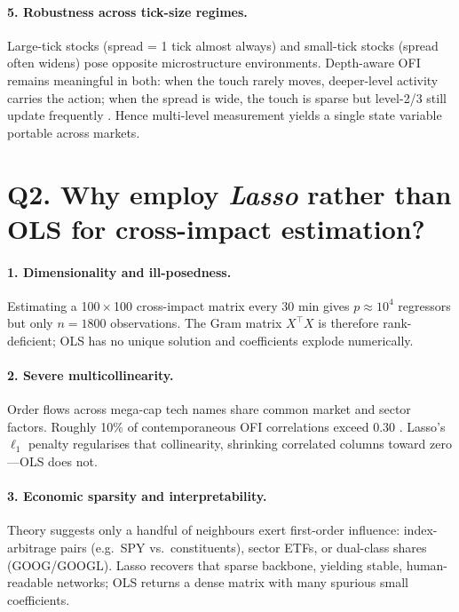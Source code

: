 \documentclass[11pt]{article}
\begin{document}
\paragraph{5. Robustness across tick-size regimes.}
Large-tick stocks (spread = 1 tick almost always) and small-tick stocks (spread often widens) pose opposite microstructure environments.  Depth-aware OFI remains meaningful in both: when the touch rarely moves, deeper-level activity carries the action; when the spread is wide, the touch is sparse but level-2/3 still update frequently \citep{CuratoLillo2015}.  Hence multi-level measurement yields a single state variable portable across markets.

\bigskip
\section*{Q2. Why employ \textit{Lasso} rather than OLS for cross-impact estimation?}

\paragraph{1. Dimensionality and ill-posedness.}
Estimating a 100\,$\times$\,100 cross-impact matrix every 30 min gives $p\!\approx\!10^{4}$ regressors but only $n=1800$ observations.  The Gram matrix $X^{\!\top}X$ is therefore rank-deficient; OLS has no unique solution and coefficients explode numerically.

\paragraph{2. Severe multicollinearity.}
Order flows across mega-cap tech names share common market and sector factors.  Roughly 10\% of contemporaneous OFI correlations exceed 0.30 \citep{PasquarielloVega2015}.  Lasso’s $\ell_{1}$ penalty regularises that collinearity, shrinking correlated columns toward zero—OLS does not.

\paragraph{3. Economic sparsity and interpretability.}
Theory suggests only a handful of neighbours exert first-order influence: index-arbitrage pairs (e.g.\ SPY vs.\ constituents), sector ETFs, or dual-class shares (GOOG/GOOGL).  Lasso recovers that sparse backbone, yielding stable, human-readable networks; OLS returns a dense matrix with many spurious small coefficients.
\end{document}
